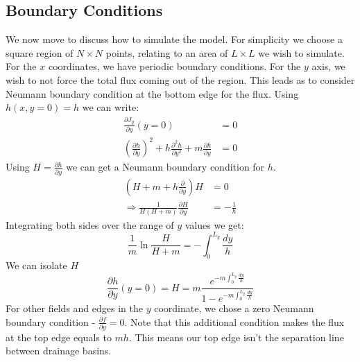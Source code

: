 \documentclass{article}
\numberwithin{equation}{section}
\begin{document}
\subsection{Boundary Conditions}
We now move to discuss how to simulate the model. For simplicity we choose a square region of $N\times N$ points, relating to an area of  $L\times L$  we wish to simulate. For the $x$ coordinates, we have periodic boundary conditions. For the $y$ axis, we wish to not force the total flux coming out of the region. This leads as to consider Neumann boundary condition at the bottom edge for the flux. Using $h(x,y=0)=h$ we can write:
\begin{align}
    \frac{\partial J_y}{\partial y}(y=0) &= 0 \\
    \left(\frac{\partial h}{\partial y}\right)^2 + h \frac{\partial^2 h}{\partial y^2} + m \frac{\partial h}{\partial y} &= 0
\end{align}
Using $H=\frac{\partial h}{\partial y}$ we can get a Neumann boundary condition for $h$.
\begin{align}
    \left(H + m + h\frac{\partial}{\partial y}\right)H &= 0 \\
    \Rightarrow \frac{1}{H(H+m)} \frac{\partial H}{\partial y} &= - \frac{1}{h}
\end{align}
Integrating both sides over the range of $y$ values we get:
\begin{equation}
    \frac{1}{m}\ln{\frac{H}{H+m}} = -\int_0^{L_y} \frac{dy}{h}  
\end{equation}
We can isolate $H$ 
\begin{equation}
    \frac{\partial h}{\partial y} (y=0) = H = m \frac{e^{-m \int_0^{L_y} \frac{dy}{h}}}{1 - e^{-m \int_0^{L_y} \frac{dy}{h}}}
\end{equation}
For other fields and edges in the $y$ coordinate, we chose a zero Neumann boundary condition - $\frac{\partial f}{\partial y}=0$. Note that this additional condition makes the flux at the top edge equals to $mh$. This means our top edge isn't the separation line between drainage basins.
\end{document}
